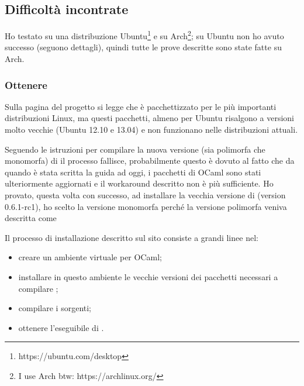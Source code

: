 \subsection{Difficoltà incontrate}
Ho testato \cduce su una distribuzione Ubuntu\footnote{https://ubuntu.com/desktop} e su Arch\footnote{I use Arch btw: https://archlinux.org/}; su Ubuntu non ho avuto successo (seguono dettagli), quindi tutte le prove descritte sono state fatte su Arch.
\subsubsection{Ottenere \cduce}
Sulla pagina del progetto si legge che \cduce è pacchettizzato per le più importanti distribuzioni Linux, ma questi pacchetti, almeno per Ubuntu risalgono a versioni molto vecchie (Ubuntu 12.10 e 13.04) e non funzionano nelle distribuzioni attuali.

Seguendo le istruzioni per compilare la nuova versione (sia polimorfa che monomorfa) di \cduce il processo fallisce, probabilmente questo è dovuto al fatto che da quando è stata scritta la guida ad oggi, i pacchetti di OCaml sono stati ulteriormente aggiornati e il workaround descritto non è più sufficiente. Ho provato, questa volta con successo, ad installare la vecchia versione di \cduce (version 0.6.1-rc1), ho scelto la versione monomorfa perché la versione polimorfa veniva descritta come 

Il processo di installazione descritto sul sito consiste a grandi linee nel:
\begin{itemize}
	\item creare un ambiente virtuale per OCaml;
	\item installare in questo ambiente le vecchie versioni dei pacchetti necessari a compilare \cduce;
	\item compilare i sorgenti;
	\item ottenere l'eseguibile di \cduce.
\end{itemize}
